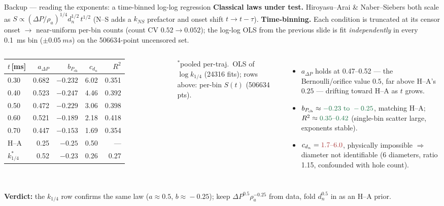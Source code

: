 \documentclass[aspectratio=169,11pt]{beamer}
\newcommand{\good}[1]{\textcolor{goodGreen}{#1}}
\newcommand{\warn}[1]{\textcolor{warnRed}{#1}}
\newcommand{\blue}[1]{\textcolor{aaltoBlue}{#1}}
\begin{document}
\begin{frame}{Backup --- reading the exponents: a time-binned log-log regression}
\small
\textbf{Classical laws under test.}\; Hiroyasu--Arai \& Naber--Siebers both scale as $S\propto(\Delta P/\rho_a)^{1/4} d_n^{1/2}\,t^{1/2}$ (N--S adds a $k_{NS}$ prefactor and onset shift $t\!\to\!t-\tau$). \textbf{Time-binning.} Each condition is truncated at its censor onset $\to$ near-uniform per-bin counts (count CV \good{$0.52\to0.052$}); the log-log OLS from the previous slide is fit \emph{independently} in every \SI{0.1}{ms} bin ($\pm\SI{0.05}{ms}$) on the \num{506634}-point uncensored set.

\smallskip
\begin{columns}[T,onlytextwidth]
\centering
\footnotesize
\renewcommand{\arraystretch}{1.0}
\setlength{\tabcolsep}{4pt}
\begin{tabular}{lrrrr}
\toprule
$t$\,[ms] & $a_{\Delta P}$ & $b_{P_{\mathrm{ch}}}$ & $c_{d_n}$ & $R^2$ \\
\midrule
0.30 & 0.682 & $-0.232$ & \warn{6.02} & 0.351 \\
0.40 & \good{0.523} & $-0.247$ & \warn{4.46} & 0.392 \\
0.50 & \good{0.472} & $-0.229$ & \warn{3.06} & 0.398 \\
0.60 & \good{0.521} & $-0.189$ & \warn{2.18} & 0.418 \\
0.70 & 0.447 & $-0.153$ & \warn{1.69} & 0.354 \\
\midrule
H--A & 0.25 & $-0.25$ & 0.50 & --- \\
$k_{1/4}^{\ast}$ & \good{0.52} & $-0.23$ & \warn{0.26} & 0.27 \\
\bottomrule
\end{tabular}

{\scriptsize $^\ast$pooled per-traj.\ OLS of $\log k_{1/4}$ (\num{24316} fits); rows above: per-bin $S(t)$ (\num{506634} pts).}
\footnotesize
\begin{itemize}\setlength\itemsep{1.5pt}
  \item $a_{\Delta P}$ holds at \good{0.47--0.52} --- the \blue{Bernoulli/orifice} value $0.5$, far above H--A's $0.25$ --- drifting toward H--A as $t$ grows.
  \item $b_{P_{\mathrm{ch}}}\approx\good{-0.23\text{ to }-0.25}$, matching H--A; $R^2\approx\good{0.35\text{--}0.42}$ (single-bin scatter large, exponents stable).
  \item $c_{d_n}=\warn{1.7\text{--}6.0}$, physically impossible $\Rightarrow$ diameter \warn{not identifiable} (6 diameters, ratio 1.15, confounded with hole count).
\end{itemize}
\end{columns}

\vspace{2pt}
{\footnotesize\textbf{Verdict:} the $k_{1/4}$ row confirms the same law ($a\!\approx\!0.5$, $b\!\approx\!-0.25$); keep $\Delta P^{0.5}\rho_a^{-0.25}$ from data, fold $d_n^{0.5}$ in as an H--A prior.}
\end{frame}
\end{document}
